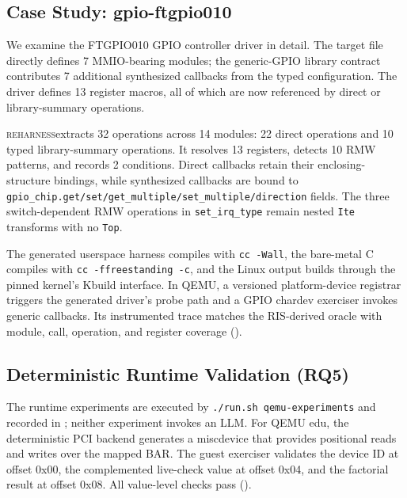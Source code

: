 \documentclass[sigplan, screen, review, anonymous]{acmart}
\newcommand{\reharness}{\textsc{reharness}}
\begin{document}
\subsection{Case Study: gpio-ftgpio010}

We examine the FTGPIO010 GPIO controller driver in detail. The target file directly defines 7 MMIO-bearing modules; the generic-GPIO library contract contributes 7 additional synthesized callbacks from the typed configuration. The driver defines 13 register macros, all of which are now referenced by direct or library-summary operations.

\reharness extracts 32 operations across 14 modules: 22 direct operations and 10 typed library-summary operations. It resolves 13 registers, detects 10 RMW patterns, and records 2 conditions. Direct callbacks retain their enclosing-structure bindings, while synthesized callbacks are bound to \texttt{gpio\_chip.get/set/get\_multiple/set\_multiple/direction} fields. The three switch-dependent RMW operations in \texttt{set\_irq\_type} remain nested \texttt{Ite} transforms with no \texttt{Top}.

The generated userspace harness compiles with \texttt{cc -Wall}, the bare-metal C compiles with \texttt{cc -ffreestanding -c}, and the Linux output builds through the pinned kernel's Kbuild interface. In QEMU, a versioned platform-device registrar triggers the generated driver's probe path and a GPIO chardev exerciser invokes generic callbacks. Its instrumented trace matches the RIS-derived oracle with \FTQEMUModuleCoverage{} module, \FTQEMUCallCoverage{} call, \FTQEMUOpCoverage{} operation, and \FTQEMURegisterCoverage{} register coverage (\texttt{\FTQEMUOracle}).

\subsection{Deterministic Runtime Validation (RQ5)}

The runtime experiments are executed by \texttt{./run.sh qemu-experiments} and recorded in ; neither experiment invokes an LLM. For QEMU edu, the deterministic PCI backend generates a miscdevice that provides positional reads and writes over the mapped BAR. The guest exerciser validates the device ID at offset 0x00, the complemented live-check value at offset 0x04, and the factorial result at offset 0x08. All value-level checks pass (\texttt{\EduQEMUOracle}).
\end{document}
